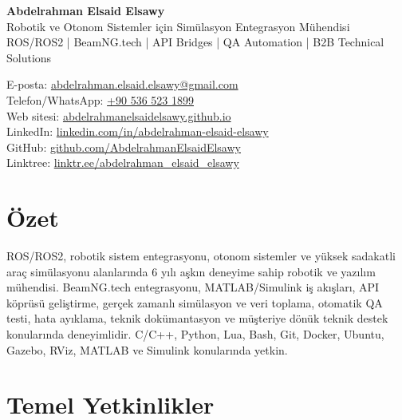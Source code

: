 \documentclass[11pt,a4paper]{article}
\begin{document}
{\LARGE \textbf{Abdelrahman Elsaid Elsawy}}\\
Robotik ve Otonom Sistemler için Simülasyon Entegrasyon Mühendisi\\
ROS/ROS2 | BeamNG.tech | API Bridges | QA Automation | B2B Technical Solutions

E-posta: \href{mailto:abdelrahman.elsaid.elsawy@gmail.com}{abdelrahman.elsaid.elsawy@gmail.com}\\
Telefon/WhatsApp: \href{https://wa.me/905365231899}{+90 536 523 1899}\\
Web sitesi: \href{https://abdelrahmanelsaidelsawy.github.io/index.html}{abdelrahmanelsaidelsawy.github.io}\\
LinkedIn: \href{https://www.linkedin.com/in/abdelrahman-elsaid-elsawy}{linkedin.com/in/abdelrahman-elsaid-elsawy}\\
GitHub: \href{https://github.com/AbdelrahmanElsaidElsawy}{github.com/AbdelrahmanElsaidElsawy}\\
Linktree: \href{https://linktr.ee/abdelrahman_elsaid_elsawy}{linktr.ee/abdelrahman\_elsaid\_elsawy}

\section*{Özet}

ROS/ROS2, robotik sistem entegrasyonu, otonom sistemler ve yüksek sadakatli araç simülasyonu alanlarında 6 yılı aşkın deneyime sahip robotik ve yazılım mühendisi. BeamNG.tech entegrasyonu, MATLAB/Simulink iş akışları, API köprüsü geliştirme, gerçek zamanlı simülasyon ve veri toplama, otomatik QA testi, hata ayıklama, teknik dokümantasyon ve müşteriye dönük teknik destek konularında deneyimlidir. C/C++, Python, Lua, Bash, Git, Docker, Ubuntu, Gazebo, RViz, MATLAB ve Simulink konularında yetkin.

\section*{Temel Yetkinlikler}
\end{document}
